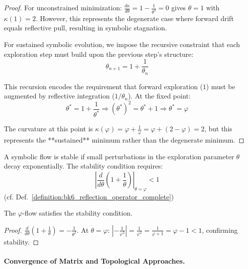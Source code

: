 \begin{proof}
For unconstrained minimization: $\frac{d\kappa}{d\theta} = 1 - \frac{1}{\theta^2} = 0$ gives $\theta = 1$ with $\kappa(1) = 2$. However, this represents the degenerate case where forward drift equals reflective pull, resulting in symbolic stagnation.

For sustained symbolic evolution, we impose the recursive constraint that each exploration step must build upon the previous step's structure:
\[
\theta_{n+1} = 1 + \frac{1}{\theta_n}
\]

This recursion encodes the requirement that forward exploration ($1$) must be augmented by reflective integration ($1/\theta_n$). At the fixed point:
\[
\theta^* = 1 + \frac{1}{\theta^*} \Rightarrow (\theta^*)^2 = \theta^* + 1 \Rightarrow \theta^* = \varphi
\]

The curvature at this point is $\kappa(\varphi) = \varphi + \frac{1}{\varphi} = \varphi + (2 - \varphi) = 2$, but this represents the **sustained** minimum rather than the degenerate minimum.
\end{proof}

\begin{definition}
\label{def:appC_symbolic_flow_stability}
A symbolic flow is stable if small perturbations in the exploration parameter $\theta$ decay exponentially. The stability condition requires:
\[
\left| \frac{d}{d\theta} \left( 1 + \frac{1}{\theta} \right) \right|_{\theta=\varphi} < 1
\]
(cf. Def.~\ref{definition:bk6_reflection_operator_complete})
\end{definition}

\begin{lemma}
\label{lem:appC_stability_phi_flow}
The $\varphi$-flow satisfies the stability condition.
\end{lemma}

\begin{proof}
$\frac{d}{d\theta} \left( 1 + \frac{1}{\theta} \right) = -\frac{1}{\theta^2}$. At $\theta = \varphi$: $\left| -\frac{1}{\varphi^2} \right| = \frac{1}{\varphi^2} = \frac{1}{\varphi + 1} = \varphi - 1 < 1$, confirming stability.
\end{proof}

\paragraph{Convergence of Matrix and Topological Approaches.}
\label{paragraph:appC_convergence_matrix_topological}

